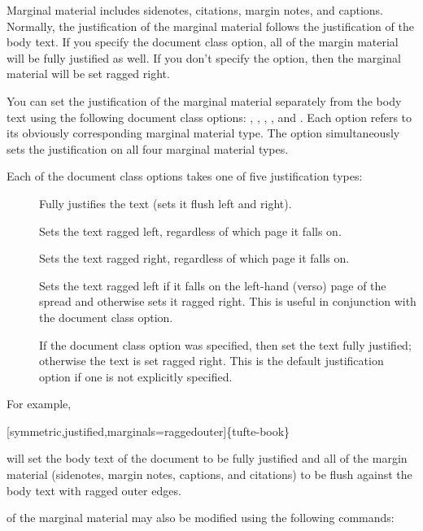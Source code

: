Marginal material includes sidenotes, citations, margin notes, and captions.
Normally, the justification of the marginal material follows the justification
of the body text.  If you specify the  document class
option, all of the margin material will be fully justified as well.  If you
don't specify the  option, then the marginal material will
be set ragged right.

You can set the justification of the marginal material separately from the body
text using the following document class options: ,
, , , and
.  Each option refers to its obviously corresponding
marginal material type.  The  option simultaneously sets
the justification on all four marginal material types.

Each of the document class options takes one of five justification types:
\begin{description}
	\item[] Fully justifies the text (sets it flush left and
	right).
	\item[] Sets the text ragged left, regardless of which
	page it falls on.
	\item[] Sets the text ragged right, regardless of
	which page it falls on.
	\item[] Sets the text ragged left if it falls on the
	left-hand (verso) page of the spread and otherwise sets it ragged right.
	This is useful in conjunction with the  document class
	option.
	\item[] If the  document class option
	was specified, then set the text fully justified; otherwise the text is set
	ragged right.  This is the default justification option if one is not
	explicitly specified.
\end{description}

\noindent For example, 
\begin{docspec}
	[symmetric,justified,marginals=raggedouter]\{tufte-book\}
\end{docspec}
will set the body text of the document to be fully justified and all of the
margin material (sidenotes, margin notes, captions, and citations) to be flush
against the body text with ragged outer edges.

 of the marginal material may also be modified using the following commands:

